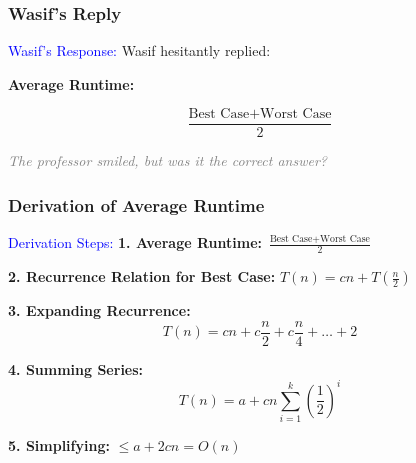 \begin{frame}
    \frametitle{Wasif's Reply}
    \vspace{0.4cm} %

    \begin{block}{\textcolor{blue}{Wasif's Response:}}
        Wasif hesitantly replied:
        \vspace{0.4cm}

            \textbf{Average Runtime:} \quad 
        \begin{center}
            \[
            \frac{\text{Best Case} + \text{Worst Case}}{2}
            \]
        \end{center}
    \end{block}

    \vspace{0.6cm} %
    \begin{center}
        \textit{\textcolor{gray}{The professor smiled, but was it the correct answer?}}
    \end{center}
\end{frame}


\begin{frame}
    \frametitle{Derivation of Average Runtime}
    \vspace{0.4cm}

    \begin{block}{\textcolor{blue}{Derivation Steps:}}
        \textbf{1. Average Runtime:} \( \frac{\text{Best Case} + \text{Worst Case}}{2} \)

        \vspace{0.3cm}
        \textbf{2. Recurrence Relation for Best Case:} \( T(n) = cn + T\left(\frac{n}{2}\right) \)

        \vspace{0.3cm}
        \textbf{3. Expanding Recurrence:}
        \[
        T(n) = cn + c\frac{n}{2} + c\frac{n}{4} + \dots + 2
        \]

        \vspace{0.3cm}
        \textbf{4. Summing Series:}
        \[
        T(n) = a + cn \sum_{i=1}^k \left(\frac{1}{2}\right)^i
        \]

        \vspace{0.3cm}
        \textbf{5. Simplifying:} \( \leq a + 2cn = O(n) \)
    \end{block}

\end{frame}

